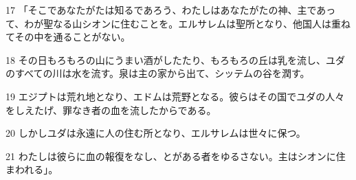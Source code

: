 \par 17 「そこであなたがたは知るであろう、わたしはあなたがたの神、主であって、わが聖なる山シオンに住むことを。エルサレムは聖所となり、他国人は重ねてその中を通ることがない。
\par 18 その日もろもろの山にうまい酒がしたたり、もろもろの丘は乳を流し、ユダのすべての川は水を流す。泉は主の家から出て、シッテムの谷を潤す。
\par 19 エジプトは荒れ地となり、エドムは荒野となる。彼らはその国でユダの人々をしえたげ、罪なき者の血を流したからである。
\par 20 しかしユダは永遠に人の住む所となり、エルサレムは世々に保つ。
\par 21 わたしは彼らに血の報復をなし、とがある者をゆるさない。主はシオンに住まわれる」。


